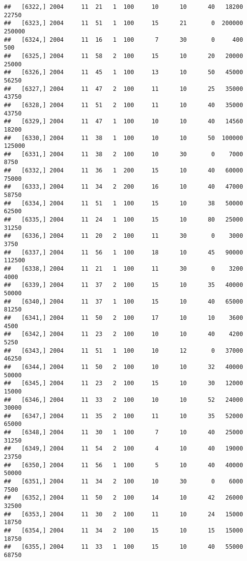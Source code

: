 \documentclass{article}\usepackage[]{graphicx}\usepackage[]{color}
\makeatletter
\newenvironment{kframe}{%
 \def\at@end@of@kframe{}%
 \ifinner\ifhmode%
  \def\at@end@of@kframe{\end{minipage}}%
  \begin{minipage}{\columnwidth}%
 \fi\fi%
 \def\FrameCommand##1{\hskip\@totalleftmargin \hskip-\fboxsep
 \colorbox{shadecolor}{##1}\hskip-\fboxsep
     \hskip-\linewidth \hskip-\@totalleftmargin \hskip\columnwidth}%
 \MakeFramed {\advance\hsize-\width
   \@totalleftmargin\z@ \linewidth\hsize
   \@setminipage}}%
 {\par\unskip\endMakeFramed%
 \at@end@of@kframe}
\newenvironment{knitrout}{}{} %
\makeatother
\begin{document}
\begin{knitrout}
\begin{kframe}
\begin{verbatim}
##   [6322,] 2004     11  21   1  100     10      10      40   18200   22750
##   [6323,] 2004     11  51   1  100     15      21       0  200000  250000
##   [6324,] 2004     11  16   1  100      7      30       0     400     500
##   [6325,] 2004     11  58   2  100     15      10      20   20000   25000
##   [6326,] 2004     11  45   1  100     13      10      50   45000   56250
##   [6327,] 2004     11  47   2  100     11      10      25   35000   43750
##   [6328,] 2004     11  51   2  100     11      10      40   35000   43750
##   [6329,] 2004     11  47   1  100     10      10      40   14560   18200
##   [6330,] 2004     11  38   1  100     10      10      50  100000  125000
##   [6331,] 2004     11  38   2  100     10      30       0    7000    8750
##   [6332,] 2004     11  36   1  200     15      10      40   60000   75000
##   [6333,] 2004     11  34   2  200     16      10      40   47000   58750
##   [6334,] 2004     11  51   1  100     15      10      38   50000   62500
##   [6335,] 2004     11  24   1  100     15      10      80   25000   31250
##   [6336,] 2004     11  20   2  100     11      30       0    3000    3750
##   [6337,] 2004     11  56   1  100     18      10      45   90000  112500
##   [6338,] 2004     11  21   1  100     11      30       0    3200    4000
##   [6339,] 2004     11  37   2  100     15      10      35   40000   50000
##   [6340,] 2004     11  37   1  100     15      10      40   65000   81250
##   [6341,] 2004     11  50   2  100     17      10      10    3600    4500
##   [6342,] 2004     11  23   2  100     10      10      40    4200    5250
##   [6343,] 2004     11  51   1  100     10      12       0   37000   46250
##   [6344,] 2004     11  50   2  100     10      10      32   40000   50000
##   [6345,] 2004     11  23   2  100     15      10      30   12000   15000
##   [6346,] 2004     11  33   2  100     10      10      52   24000   30000
##   [6347,] 2004     11  35   2  100     11      10      35   52000   65000
##   [6348,] 2004     11  30   1  100      7      10      40   25000   31250
##   [6349,] 2004     11  54   2  100      4      10      40   19000   23750
##   [6350,] 2004     11  56   1  100      5      10      40   40000   50000
##   [6351,] 2004     11  34   2  100     10      30       0    6000    7500
##   [6352,] 2004     11  50   2  100     14      10      42   26000   32500
##   [6353,] 2004     11  30   2  100     11      10      24   15000   18750
##   [6354,] 2004     11  34   2  100     15      10      15   15000   18750
##   [6355,] 2004     11  33   1  100     15      10      40   55000   68750

\end{verbatim}
\end{kframe}
\end{knitrout}
\end{document}
